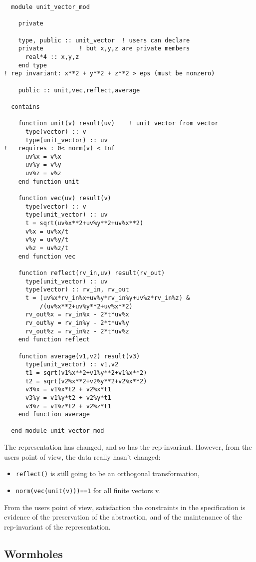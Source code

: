 \begin{verbatim}
  module unit_vector_mod

    private

    type, public :: unit_vector  ! users can declare 
    private          ! but x,y,z are private members
      real*4 :: x,y,z
    end type
! rep invariant: x**2 + y**2 + z**2 > eps (must be nonzero)

    public :: unit,vec,reflect,average

  contains

    function unit(v) result(uv)    ! unit vector from vector
      type(vector) :: v
      type(unit_vector) :: uv
!   requires : 0< norm(v) < Inf
      uv%x = v%x
      uv%y = v%y
      uv%z = v%z
    end function unit

    function vec(uv) result(v)
      type(vector) :: v
      type(unit_vector) :: uv
      t = sqrt(uv%x**2+uv%y**2+uv%x**2)
      v%x = uv%x/t
      v%y = uv%y/t
      v%z = uv%z/t
    end function vec

    function reflect(rv_in,uv) result(rv_out)
      type(unit_vector) :: uv
      type(vector) :: rv_in, rv_out
      t = (uv%x*rv_in%x+uv%y*rv_in%y+uv%z*rv_in%z) &
          /(uv%x**2+uv%y**2+uv%x**2)
      rv_out%x = rv_in%x - 2*t*uv%x
      rv_out%y = rv_in%y - 2*t*uv%y
      rv_out%z = rv_in%z - 2*t*uv%z
    end function reflect

    function average(v1,v2) result(v3)
      type(unit_vector) :: v1,v2
      t1 = sqrt(v1%x**2+v1%y**2+v1%x**2)
      t2 = sqrt(v2%x**2+v2%y**2+v2%x**2)
      v3%x = v1%x*t2 + v2%x*t1
      v3%y = v1%y*t2 + v2%y*t1
      v3%z = v1%z*t2 + v2%z*t1
    end function average

  end module unit_vector_mod
\end{verbatim}

The representation has changed, and so has the rep-invariant.
However, from the users point of view, the data really hasn't changed:
\begin{itemize}
\item \verb+reflect()+ is still going to be an orthogonal transformation,
\item \verb+norm(vec(unit(v)))==1+ for all finite
vectors v.
\end{itemize}
From the users point of view, satisfaction the constraints
in the specification is evidence of the 
preservation of the abstraction, and of the maintenance
of the rep-invariant of the representation.

\subsection{Wormholes}

